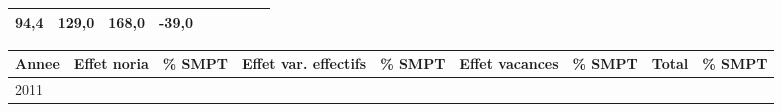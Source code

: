 \begin{longtable}[]{@{}lllllllll@{}}
\begin{minipage}[t]{0.10\columnwidth}
94,4\strut
\end{minipage} & \begin{minipage}[t]{0.07\columnwidth}\raggedright
129,0\strut
\end{minipage} & \begin{minipage}[t]{0.07\columnwidth}\raggedright
168,0\strut
\end{minipage} & \begin{minipage}[t]{0.11\columnwidth}\raggedright
-39,0\strut
\end{minipage} & \begin{minipage}[t]{0.14\columnwidth}\raggedright
\strut
\end{minipage}\tabularnewline
\bottomrule
\end{longtable}

\begin{longtable}[]{@{}lllllllll@{}}
\toprule
\begin{minipage}[b]{0.05\columnwidth}\raggedright
Annee\strut
\end{minipage} & \begin{minipage}[b]{0.10\columnwidth}\raggedright
Effet noria\strut
\end{minipage} & \begin{minipage}[b]{0.06\columnwidth}\raggedright
\% SMPT\strut
\end{minipage} & \begin{minipage}[b]{0.16\columnwidth}\raggedright
Effet var. effectifs\strut
\end{minipage} & \begin{minipage}[b]{0.06\columnwidth}\raggedright
\% SMPT\strut
\end{minipage} & \begin{minipage}[b]{0.12\columnwidth}\raggedright
Effet vacances\strut
\end{minipage} & \begin{minipage}[b]{0.06\columnwidth}\raggedright
\% SMPT\strut
\end{minipage} & \begin{minipage}[b]{0.10\columnwidth}\raggedright
Total\strut
\end{minipage} & \begin{minipage}[b]{0.06\columnwidth}\raggedright
\% SMPT\strut
\end{minipage}\tabularnewline
\midrule
\endhead
\begin{minipage}[t]{0.05\columnwidth}\raggedright
2011\strut
\end{minipage} & \begin{minipage}[t]{0.10\columnwidth}\raggedright

\end{minipage}
\end{longtable}

